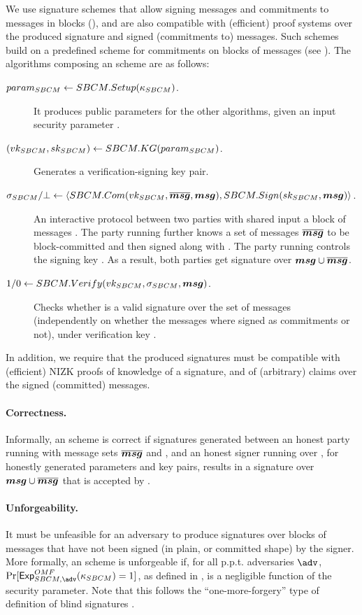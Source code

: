 We use signature schemes that allow signing messages and commitments to messages
in blocks (\SBCM), and are also compatible with (efficient) proof systems over
the produced signature and signed (commitments to) messages. Such schemes build
on a predefined scheme for commitments on blocks of messages \C (see
). The algorithms composing an \SBCM scheme are as
follows:

\begin{description}
\item[$param_{SBCM} \gets SBCM.Setup(\kappa_{SBCM})$.] It produces public parameters
  for the other algorithms, given an input security parameter \Ssecpar.
\item[$(vk_{SBCM},sk_{SBCM}) \gets SBCM.KG(param_{SBCM})$.] Generates a
  verification-signing key pair.
\item[$\sigma_{SBCM}/\bot \gets \langle SBCM.Com(vk_{SBCM},\overline{\boldsymbol{msg}},\boldsymbol{msg}),
  SBCM.Sign(sk_{SBCM},\boldsymbol{msg}) \rangle$.] An interactive protocol between two
  parties with shared input a block of messages \smsg. The party running
  \SBCMCom further knows a set of messages $\overline{\boldsymbol{msg}}$ to be
  block-committed and then signed along with \smsg. The party running \SBCMSign
  controls the signing key \SBCMsk. As a result, both parties get signature
  \SBCMsig over $\boldsymbol{msg} \cup \overline{\boldsymbol{msg}}$.
\item[$1/0 \gets SBCM.Verify(vk_{SBCM},\sigma_{SBCM},\boldsymbol{msg})$.] Checks whether \SBCMsig
  is a valid signature over the set of messages \smsg (independently on whether
  the messages where signed as commitments or not), under verification key
  \SBCMvk.
\end{description}

In addition, we require that the produced signatures must be compatible with
(efficient) NIZK proofs of knowledge of a signature, and of (arbitrary) claims
over the signed (committed) messages.

\paragraph{Correctness.} %
Informally, an \SBCM scheme is correct if signatures generated between an honest
party running \SBCMCom with message sets $\overline{\boldsymbol{msg}}$ and \smsg, and an
honest signer running \SBCMSign over \smsg, for honestly generated parameters
and key pairs, results in a signature over $\boldsymbol{msg} \cup \overline{\boldsymbol{msg}}$ that is
accepted by \SBCMVerify.

\paragraph{Unforgeability.} %
It must be unfeasible for an adversary to produce signatures over blocks of
messages that have not been signed (in plain, or committed shape) by the
signer. More formally, an \SBCM scheme is unforgeable if, for all p.p.t.
adversaries $\adv$, $\Pr[\ExpSBCMOMF(\SBCMsecpar) = 1]$, as defined in
, is a negligible function of the security parameter.
Note that this follows the ``one-more-forgery'' type of definition of blind
signatures \cite{bold02}.

